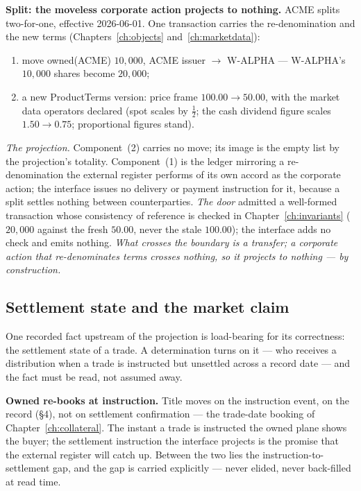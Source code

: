 \medskip\noindent\textbf{Split: the moveless corporate action projects to nothing.}
ACME splits two-for-one, effective 2026-06-01. One transaction carries the
re-denomination and the new terms (Chapters~\ref{ch:objects} and~\ref{ch:marketdata}):
\begin{enumerate}[label=(\arabic*),nosep]
\item move owned(ACME) $10{,}000$, ACME issuer $\to$ W-ALPHA --- W-ALPHA's
$10{,}000$ shares become $20{,}000$;
\item a new ProductTerms version: price frame $100.00 \to 50.00$, with the market
data operators declared (spot scales by $\tfrac12$; the cash dividend figure scales
$1.50 \to 0.75$; proportional figures stand).
\end{enumerate}
\emph{The projection.} Component~(2) carries no move; its image is the empty list by
the projection's totality. Component~(1) is the ledger mirroring a re-denomination
the external register performs of its own accord as the corporate action; the
interface issues no delivery or payment instruction for it, because a split settles
nothing between counterparties.
\emph{The door} admitted a well-formed transaction whose consistency of reference
is checked in Chapter~\ref{ch:invariants} ($20{,}000$ against the fresh $50.00$,
never the stale $100.00$); the interface adds no check and emits nothing.
\emph{What crosses the boundary is a transfer; a corporate action that
re-denominates terms crosses nothing, so it projects to nothing --- by
construction.}

\subsection{Settlement state and the market claim}

One recorded fact upstream of the projection is load-bearing for its correctness:
the settlement state of a trade. A determination turns on it --- who receives a
distribution when a trade is instructed but unsettled across a record date --- and
the fact must be read, not assumed away.

\medskip\noindent\textbf{Owned re-books at instruction.} Title moves on the
instruction event, on the record (\S4), not on settlement confirmation --- the
trade-date booking of Chapter~\ref{ch:collateral}. The instant a trade is
instructed the owned plane shows the buyer; the settlement instruction the
interface projects is the promise that the external register will catch up. Between
the two lies the instruction-to-settlement gap, and the gap is carried explicitly
--- never elided, never back-filled at read time.

